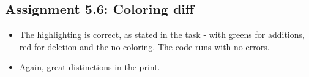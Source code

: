 \documentclass[a4paper]{article}
\begin{document}
\subsection*{Assignment 5.6:  Coloring diff}
\begin{itemize}
\item The highlighting is correct, as stated in the task - with greens for additions, red for deletion and the no coloring. The code runs with no errors. 
\item Again, great distinctions in the print.
\end{itemize}
 




\end{document}

